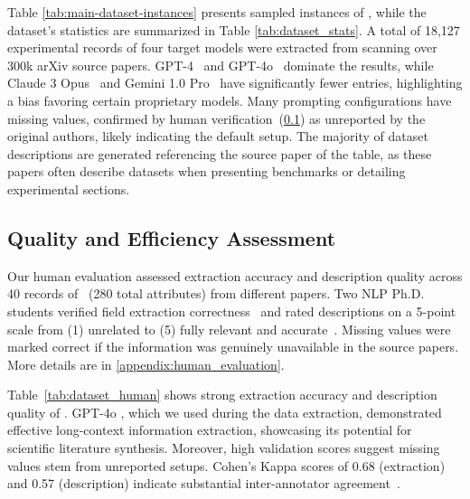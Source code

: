 
Table \ref{tab:main-dataset-instances} presents sampled instances of \datasetname, while the dataset's statistics are summarized in Table \ref{tab:dataset_stats}.
A total of 18,127 experimental records of four target models were extracted from scanning over 300k arXiv source papers.
GPT-4~\citep{achiam2023gpt} and GPT-4o~\citep{achiam2023gpt} dominate the results, while Claude 3 Opus~\citep{anthropic@claude} and Gemini 1.0 Pro~\citep{team2023gemini} have significantly fewer entries, highlighting a bias favoring certain proprietary models. 
Many prompting configurations have missing values, confirmed by human verification~(\cref{subsec:quality_assessment}) as unreported by the original authors, likely indicating the default setup.
The majority of dataset descriptions are generated referencing the source paper of the table, as these papers often describe datasets when presenting benchmarks or detailing experimental sections.


\subsection{Quality and Efficiency Assessment}
\label{subsec:quality_assessment}

Our human evaluation assessed extraction accuracy and description quality across 40 records of \datasetname~(280 total attributes) from different papers. 
Two NLP Ph.D. students verified field extraction correctness~\citep{bai2023schema} and rated descriptions on a 5-point scale from (1) unrelated to (5) fully relevant and accurate~\citep{amidei2019use, liu2023geval}. 
Missing values were marked correct if the information was genuinely unavailable in the source papers.
More details are in \cref{appendix:human_evaluation}.

Table~\ref{tab:dataset_human} shows strong extraction accuracy and description quality of \datasetname. 
GPT-4o \citep{hurst2024gpt}, which we used during the data extraction, demonstrated effective long-context information extraction, showcasing its potential for scientific literature synthesis.
Moreover, high validation scores suggest missing values stem from unreported setups. 
Cohen's Kappa scores of 0.68 (extraction) and 0.57 (description) indicate substantial inter-annotator agreement~\citep{mchugh2012interrater}.

